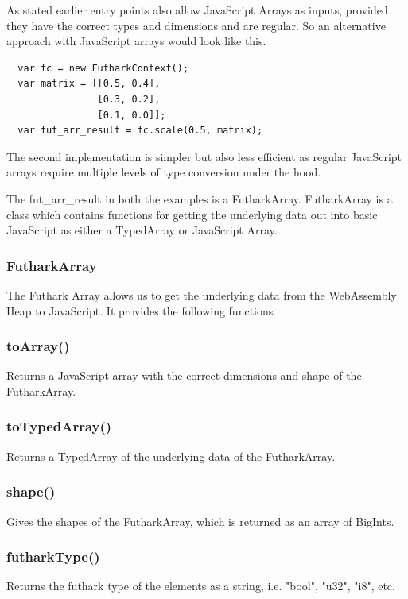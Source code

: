 \documentclass[11pt]{book}
\begin{document}
As stated earlier entry points also allow JavaScript Arrays as inputs, provided they have the correct types and dimensions and are regular. So an alternative approach with JavaScript arrays would look like this.

\begin{verbatim}
  var fc = new FutharkContext();
  var matrix = [[0.5, 0.4], 
                [0.3, 0.2],
                [0.1, 0.0]];
  var fut_arr_result = fc.scale(0.5, matrix);
\end{verbatim}

The second implementation is simpler but also less efficient as regular JavaScript arrays require multiple levels of type conversion under the hood.

The fut\_arr\_result in both the examples is a FutharkArray. FutharkArray is a class which contains functions for getting the underlying data out into basic JavaScript as either a TypedArray or JavaScript Array.

\subsubsection*{FutharkArray}
The Futhark Array allows us to get the underlying data from the WebAssembly Heap to JavaScript. It provides the following functions.

\subsubsection*{toArray()}
Returns a JavaScript array with the correct dimensions and shape of the FutharkArray.

\subsubsection*{toTypedArray()}
Returns a TypedArray of the underlying data of the FutharkArray.

\subsubsection*{shape()}
Gives the shapes of the FutharkArray, which is returned as an array of BigInts.

\subsubsection*{futharkType()}
Returns the futhark type of the elements as a string, i.e. "bool", "u32", "i8", etc.
\end{document}
